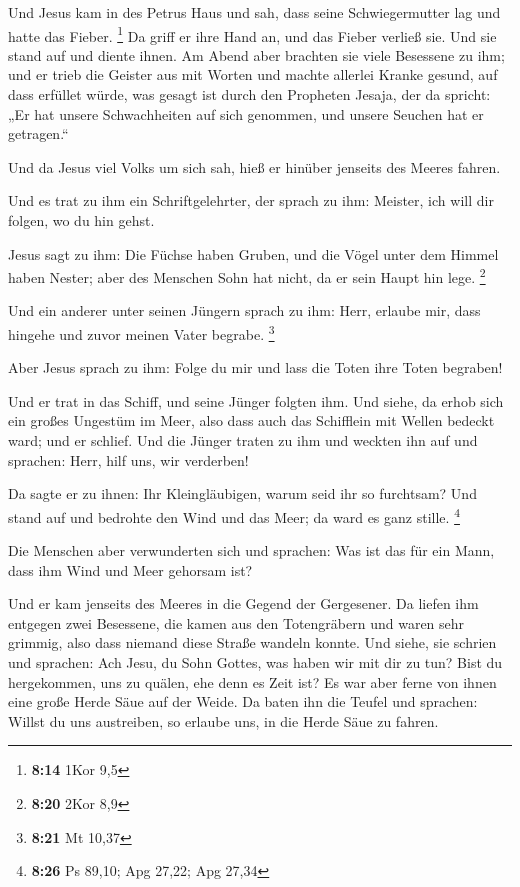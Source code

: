  Und Jesus kam in des Petrus Haus und sah, dass seine
Schwiegermutter lag und hatte das Fieber. \footnote{\textbf{8:14} 1Kor
  9,5}  Da griff er ihre Hand an, und das Fieber verließ
sie. Und sie stand auf und diente ihnen.  Am Abend aber
brachten sie viele Besessene zu ihm; und er trieb die Geister aus mit
Worten und machte allerlei Kranke gesund,  auf dass
erfüllet würde, was gesagt ist durch den Propheten Jesaja, der da
spricht: „Er hat unsere Schwachheiten auf sich genommen, und unsere
Seuchen hat er getragen.``

 Und da Jesus viel Volks um sich sah, hieß er hinüber
jenseits des Meeres fahren.

 Und es trat zu ihm ein Schriftgelehrter, der sprach zu
ihm: Meister, ich will dir folgen, wo du hin gehst.

 Jesus sagt zu ihm: Die Füchse haben Gruben, und die
Vögel unter dem Himmel haben Nester; aber des Menschen Sohn hat nicht,
da er sein Haupt hin lege. \footnote{\textbf{8:20} 2Kor 8,9}

 Und ein anderer unter seinen Jüngern sprach zu ihm:
Herr, erlaube mir, dass hingehe und zuvor meinen Vater begrabe.
\footnote{\textbf{8:21} Mt 10,37}

 Aber Jesus sprach zu ihm: Folge du mir und lass die
Toten ihre Toten begraben!

 Und er trat in das Schiff, und seine Jünger folgten ihm.
 Und siehe, da erhob sich ein großes Ungestüm im Meer,
also dass auch das Schifflein mit Wellen bedeckt ward; und er schlief.
 Und die Jünger traten zu ihm und weckten ihn auf und
sprachen: Herr, hilf uns, wir verderben!

 Da sagte er zu ihnen: Ihr Kleingläubigen, warum seid ihr
so furchtsam? Und stand auf und bedrohte den Wind und das Meer; da ward
es ganz stille. \footnote{\textbf{8:26} Ps 89,10; Apg 27,22; Apg 27,34}

 Die Menschen aber verwunderten sich und sprachen: Was
ist das für ein Mann, dass ihm Wind und Meer gehorsam ist?

 Und er kam jenseits des Meeres in die Gegend der
Gergesener. Da liefen ihm entgegen zwei Besessene, die kamen aus den
Totengräbern und waren sehr grimmig, also dass niemand diese Straße
wandeln konnte.  Und siehe, sie schrien und sprachen: Ach
Jesu, du Sohn Gottes, was haben wir mit dir zu tun? Bist du hergekommen,
uns zu quälen, ehe denn es Zeit ist?  Es war aber ferne
von ihnen eine große Herde Säue auf der Weide.  Da baten
ihn die Teufel und sprachen: Willst du uns austreiben, so erlaube uns,
in die Herde Säue zu fahren.

